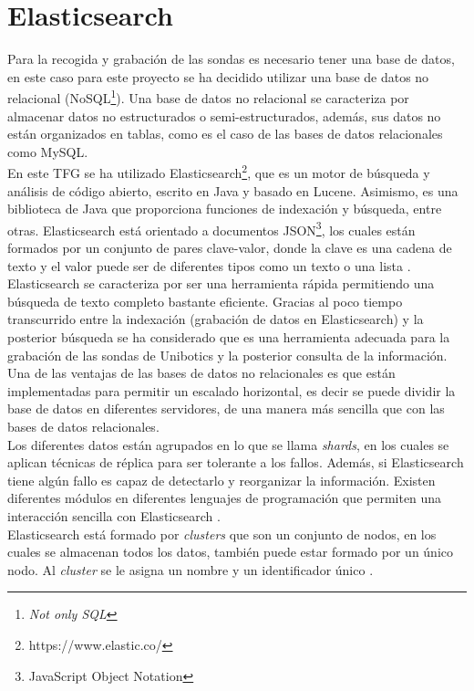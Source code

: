 \section{Elasticsearch}
Para la recogida y grabación de las sondas es necesario tener una base de datos, en este caso para este proyecto se ha decidido utilizar una base de datos no relacional (NoSQL\footnote{\textit{Not only SQL}}). Una base de datos no relacional se caracteriza por almacenar datos no estructurados o semi-estructurados, además, sus datos no están organizados en tablas, como es el caso de las bases de datos relacionales como MySQL.\\

En este TFG se ha utilizado Elasticsearch\footnote{https://www.elastic.co/}, que es un motor de búsqueda y análisis de código abierto, escrito en Java y basado en Lucene. Asimismo, es una biblioteca de Java que proporciona funciones de indexación y búsqueda, entre otras. Elasticsearch está orientado a documentos JSON\footnote{JavaScript Object Notation}, los cuales están formados por un conjunto de pares clave-valor, donde la clave es una cadena de texto y el valor puede ser de diferentes tipos como un texto o una lista \cite{elastic}.\\

Elasticsearch se caracteriza por ser una herramienta rápida permitiendo una búsqueda de texto completo bastante eficiente. Gracias al poco tiempo transcurrido entre la indexación (grabación de datos en Elasticsearch) y la posterior búsqueda se ha considerado que es una herramienta adecuada para la grabación de las sondas de Unibotics y la posterior consulta de la información.\\

Una de las ventajas de las bases de datos no relacionales es que están implementadas para permitir un escalado horizontal, es decir se puede dividir la base de datos en diferentes servidores, de una manera más sencilla que con las bases de datos relacionales.\\

Los diferentes datos están agrupados en lo que se llama \textit{shards}, en los cuales se aplican técnicas de réplica para ser tolerante a los fallos. Además, si Elasticsearch tiene algún fallo es capaz de detectarlo y reorganizar la información. Existen diferentes módulos en diferentes lenguajes de programación que permiten una interacción sencilla con Elasticsearch \cite{elastic2}.\\

Elasticsearch está formado por \textit{clusters} que son un conjunto de nodos, en los cuales se almacenan todos los datos, también puede estar formado por un único nodo. Al \textit{cluster} se le asigna un nombre y un identificador único \cite{elastic3}.\\


